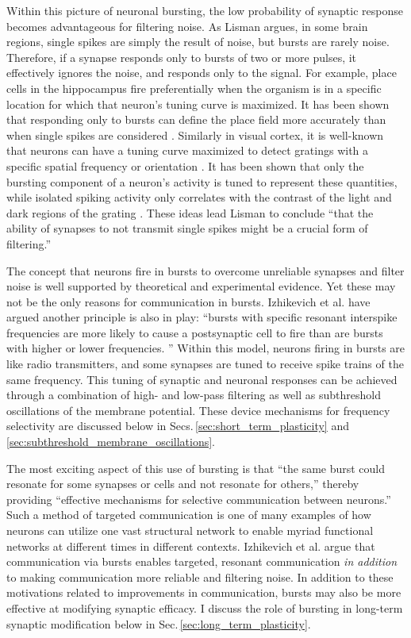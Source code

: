 \documentclass[twocolumn]{article}
\begin{document}
Within this picture of neuronal bursting, the low probability of synaptic response becomes advantageous for filtering noise. As Lisman argues, in some brain regions, single spikes are simply the result of noise, but bursts are rarely noise. Therefore, if a synapse responds only to bursts of two or more pulses, it effectively ignores the noise, and responds only to the signal. For example, place cells in the hippocampus \cite{frbu2018} fire preferentially when the organism is in a specific location for which that neuron's tuning curve is maximized. It has been shown that responding only to bursts can define the place field more accurately than when single spikes are considered \cite{otei1991}. Similarly in visual cortex, it is well-known that neurons can have a tuning curve maximized to detect gratings with a specific spatial frequency or orientation \cite{daab2001}. It has been shown that only the bursting component of a neuron's activity is tuned to represent these quantities, while isolated spiking activity only correlates with the contrast of the light and dark regions of the grating \cite{cama1981}. These ideas lead Lisman to conclude ``that the ability of synapses to not transmit single spikes might be a crucial form of filtering.'' \cite{li1997} 

The concept that neurons fire in bursts to overcome unreliable synapses and filter noise is well supported by theoretical and experimental evidence. Yet these may not be the only reasons for communication in bursts. Izhikevich et al. have argued another principle is also in play: ``bursts with specific resonant interspike frequencies are more likely to cause a postsynaptic cell to fire than are bursts with higher or lower frequencies. '' \cite{izde2003} Within this model, neurons firing in bursts are like radio transmitters, and some synapses are tuned to receive spike trains of the same frequency. This tuning of synaptic and neuronal responses can be achieved through a combination of high- and low-pass filtering as well as subthreshold oscillations of the membrane potential. These device mechanisms for frequency selectivity are discussed below in Secs.\,\ref{sec:short_term_plasticity} and \ref{sec:subthreshold_membrane_oscillations}. 

The most exciting aspect of this use of bursting is that ``the same burst could resonate for some synapses or cells and not resonate for others,'' thereby providing ``effective mechanisms for selective communication between neurons.'' Such a method of targeted communication is one of many examples of how neurons can utilize one vast structural network to enable myriad functional networks at different times in different contexts. Izhikevich et al. argue that communication via bursts enables targeted, resonant communication \textit{in addition} to making communication more reliable and filtering noise. In addition to these motivations related to improvements in communication, bursts may also be more effective at modifying synaptic efficacy. I discuss the role of bursting in long-term synaptic modification below in Sec.\,\ref{sec:long_term_plasticity}.
\end{document}
